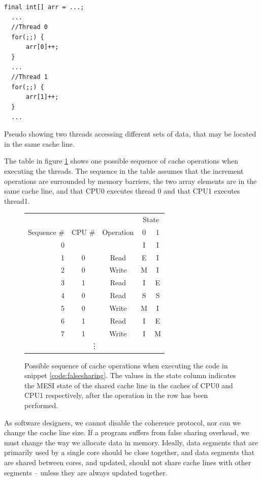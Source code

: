 \begin{code}
\begin{Verbatim}[frame=single]
  final int[] arr = ...;
  ...
  //Thread 0
  for(;;) {
	  arr[0]++;
  }
  ...
  //Thread 1
  for(;;) {
	  arr[1]++;
  }
  ...
\end{Verbatim}
	\caption{Pseudo showing two threads accessing different sets of data,
	that may be located in the same cache line.}
	\label{code:falsesharing}
\end{code}

The table in figure \ref{table:invalidationsequence} shows one possible sequence
of cache operations when executing the threads. The sequence in the table
assumes that the increment operations are surrounded by memory barriers, the two
array elements are in the same cache line, and that CPU0 executes thread 0 and
that CPU1 executes thread1.

\begin{figure}[hbtp]
	\centering
	\begin{tabular}{|r|c|c||c|c|}
	\hline
	& & & \multicolumn{2}{c|}{State} \\
		\cline{4-5}
	Sequence \# & CPU \# & Operation & 0 & 1\\
	\hline
	\hline
	0 & & & I & I\\
	\hline
	1 & 0 & Read & E & I\\
	\hline
	2 & 0 & Write & M & I\\
	\hline
	3 & 1 & Read & I & E\\
	\hline
	4 & 0 & Read & S & S\\
	\hline
	5 & 0 & Write & M & I\\
	\hline
	6 & 1 & Read & I & E\\
	\hline
	7 & 1 & Write & I & M\\
		\multicolumn{5}{c}{\vdots}
\end{tabular}
	\caption{Possible sequence of cache operations when executing the code
	in snippet \ref{code:falsesharing}. The values in the state column
	indicates the MESI state of the shared cache line in the caches of CPU0
	and CPU1 respectively, after the operation in the row has been performed.}
	\label{table:invalidationsequence}
\end{figure}

As software designers, we cannot disable the coherence protocol, nor can we
change the cache line size. If a program suffers from false sharing overhead, we
must change the way we allocate data in memory. Ideally, data segments that are
primarily used by a single core should be close together, and data segments that
are shared between cores, and updated, should not share cache lines with other segments
-- unless they are always updated together.

